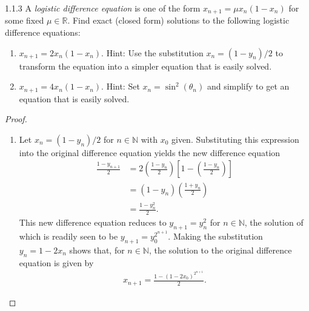 \begin{problem}{1.1.3}
  A \emph{logistic difference equation} is one of the form $x_{n+1} = \mu x_{n} (1-x_n)$
  for some fixed $\mu \in \mathbb{R}$. Find exact (closed form) solutions to the following
  logistic difference equations:
  \begin{enumerate}
    \item $x_{n+1} = 2 x_{n} (1 - x_n)$. Hint: Use the substitution $x_n = (1 - y_n) / 2$
      to transform the equation into a simpler equation that is easily solved.
    \item $x_{n+1} = 4 x_n (1 - x_n)$. Hint: Set $x_n = \sin^2(\theta_n)$ and simplify
      to get an equation that is easily solved.
  \end{enumerate}
\end{problem}

\begin{proof}
  \begin{enumerate}
    \item Let $x_n = (1 - y_n) / 2$ for $n \in \mathbb{N}$ with $x_0$ given.
      Substituting this expression into the original difference equation yields the new
      difference equation
      \begin{align*}
        \frac{1 - y_{n+1}}{2} &= 2\left( \frac{1 - y_n}{2} \right) \left[ 1 - \left(\frac{1 - y_n}{2}\right) \right] \\
        &= (1 - y_n)\left(\frac{1 + y_n}{2}\right) \\
        &= \frac{1 - y_n^2}{2}.
      \end{align*}
      This new difference equation reduces to $y_{n+1} = y_n^2$ for $n\in\mathbb{N}$,
      the solution of which is readily seen to be $y_{n+1} = y_0 ^{2^{n+1}}$. Making
      the substitution $y_n = 1 - 2 x_n$ shows that, for $n\in\mathbb{N}$,
      the solution to the original difference equation is given by
      \begin{align*}
        x_{n+1} = \frac{1 - (1- 2x_0)^{2^{n+1}}}{2}.
      \end{align*}
  \end{enumerate}
\end{proof}
\newpage
